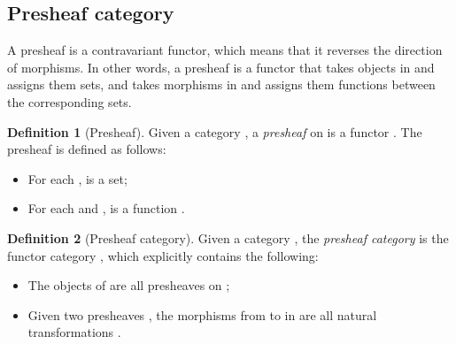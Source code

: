 \documentclass[12pt,a4paper]{report}
\theoremstyle{definition}
\newtheorem{definition}{Definition}[chapter]
\begin{document}
        \subsection{Presheaf category}
        A presheaf is a contravariant functor, which means that it reverses the direction of morphisms. In other words, a presheaf is a functor that takes objects in  and assigns them sets, and takes morphisms in  and assigns them functions between the corresponding sets.
        \begin{definition}[Presheaf]
            Given a category , a \emph{presheaf} on  is a functor .
            The presheaf  is defined as follows:
            \begin{itemize}
                \item 
                    For each ,  is a set;
                \item
                    For each  and ,  is a function .
            \end{itemize}
        \end{definition}

        \begin{definition}[Presheaf category]
            Given a category , the \emph{presheaf category}  is the functor category , which explicitly contains the following:
            \begin{itemize}
                \item 
                    The objects of  are all presheaves on ;
                \item
                    Given two presheaves , the morphisms from  to  in  are all natural transformations .
            \end{itemize}
        \end{definition}
\end{document}
